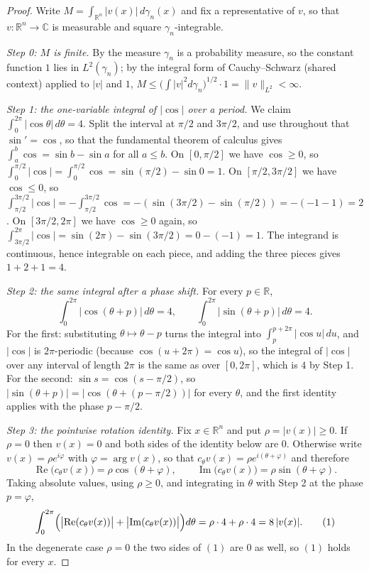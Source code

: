 \begin{proof}
Write $M = \int_{\mathbb{R}^n}|v(x)|\,d\gamma_n(x)$ and fix a representative of
$v$, so that $v : \mathbb{R}^n \to \mathbb{C}$ is measurable and square
$\gamma_n$-integrable.

\emph{Step 0: $M$ is finite.}
By  the measure $\gamma_n$ is a probability measure, so the
constant function $1$ lies in $L^2(\gamma_n)$; by the integral form of
Cauchy--Schwarz (shared context) applied to $|v|$ and $1$,
$M \leq \bigl(\int |v|^2 d\gamma_n\bigr)^{1/2}\cdot 1 = \|v\|_{L^2} < \infty$.

\emph{Step 1: the one-variable integral of $|\cos|$ over a period.}
We claim $\int_0^{2\pi}|\cos\theta|\,d\theta = 4$.  Split the interval at
$\pi/2$ and $3\pi/2$, and use throughout that $\sin' = \cos$, so that the
fundamental theorem of calculus gives $\int_a^b \cos = \sin b - \sin a$ for all
$a \leq b$.  On $[0,\pi/2]$ we have $\cos \geq 0$, so
$\int_0^{\pi/2}|\cos| = \int_0^{\pi/2}\cos = \sin(\pi/2) - \sin 0 = 1$.  On
$[\pi/2, 3\pi/2]$ we have $\cos \leq 0$, so
$\int_{\pi/2}^{3\pi/2}|\cos| = -\int_{\pi/2}^{3\pi/2}\cos
 = -(\sin(3\pi/2) - \sin(\pi/2)) = -(-1-1) = 2$.  On $[3\pi/2, 2\pi]$ we have
$\cos \geq 0$ again, so
$\int_{3\pi/2}^{2\pi}|\cos| = \sin(2\pi) - \sin(3\pi/2) = 0 - (-1) = 1$.  The
integrand is continuous, hence integrable on each piece, and adding the three
pieces gives $1 + 2 + 1 = 4$.

\emph{Step 2: the same integral after a phase shift.}
For every $p \in \mathbb{R}$,
\[
  \int_0^{2\pi}\bigl|\cos(\theta + p)\bigr|\,d\theta = 4,
  \qquad
  \int_0^{2\pi}\bigl|\sin(\theta + p)\bigr|\,d\theta = 4 .
\]
For the first: substituting $\theta \mapsto \theta - p$ turns the integral into
$\int_p^{p+2\pi}|\cos u|\,du$, and $|\cos|$ is $2\pi$-periodic (because
$\cos(u + 2\pi) = \cos u$), so the integral of $|\cos|$ over any interval of
length $2\pi$ is the same as over $[0,2\pi]$, which is $4$ by Step 1.  For the
second: $\sin s = \cos(s - \pi/2)$, so
$|\sin(\theta+p)| = |\cos(\theta + (p - \pi/2))|$ for every $\theta$, and the
first identity applies with the phase $p - \pi/2$.

\emph{Step 3: the pointwise rotation identity.}
Fix $x \in \mathbb{R}^n$ and put $\rho = |v(x)| \geq 0$.  If $\rho = 0$ then
$v(x) = 0$ and both sides of the identity below are $0$.  Otherwise write
$v(x) = \rho e^{i\varphi}$ with $\varphi = \arg v(x)$, so that
$c_\theta v(x) = \rho e^{i(\theta + \varphi)}$ and therefore
\[
  \operatorname{Re}\bigl(c_\theta v(x)\bigr) = \rho\cos(\theta + \varphi),
  \qquad
  \operatorname{Im}\bigl(c_\theta v(x)\bigr) = \rho\sin(\theta + \varphi) .
\]
Taking absolute values, using $\rho \geq 0$, and integrating in $\theta$ with
Step 2 at the phase $p = \varphi$,
\begin{equation*}
  \int_0^{2\pi}\Bigl(\bigl|\operatorname{Re}(c_\theta v(x))\bigr|
      + \bigl|\operatorname{Im}(c_\theta v(x))\bigr|\Bigr)d\theta
    = \rho \cdot 4 + \rho \cdot 4 = 8\,|v(x)| . \tag{1}
\end{equation*}
In the degenerate case $\rho = 0$ the two sides of $(1)$ are $0$ as well, so
$(1)$ holds for every $x$.


\end{proof}
